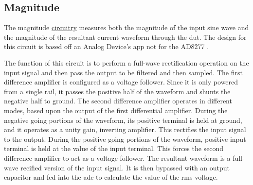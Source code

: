 \subsection{Magnitude}

The magnitude \hyperlink{sch:imph}{circuitry} measures both the magnitude of the input sine wave and the magnitude of the resultant current waveform through the \gls{dut}. The design for this circuit is based off an Analog Device's app not for the AD8277 \cite{absCircuit}.

The function of this circuit is to perform a full-wave rectification operation on the input signal and then pass the output to be filtered and then sampled. The first difference amplifier is configured as a voltage follower. Since it is only powered from a single rail, it passes the positive half of the waveform and shunts the negative half to ground. The second difference amplifier operates in different modes, based upon the output of the first differential amplifier. During the negative going portions of the waveform, its positive terminal is held at ground, and it operates as a unity gain, inverting amplifier. This rectifies the input signal to the output. During the positive going portions of the waveform, positive input terminal is held at the value of the input terminal. This forces the second difference amplifier to act as a voltage follower. The resultant waveform is a full-wave recified version of the input signal. It is then bypassed with an output capacitor and fed into the \gls{adc} to calculate the value of the rms voltage.

